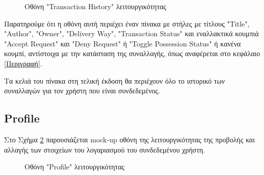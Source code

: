 \documentclass[12pt,a4paper]{article}
\begin{document}
\begin{figure}[H]
	\caption{Οθόνη "Transaction History" λειτουργικότητας}
	\label{Οθόνη "Transaction History" λειτουργικότητας}
\end{figure}

Παρατηρούμε ότι η οθόνη αυτή περιέχει έναν πίνακα με στήλες με τίτλους "Title", "Author", "Owner", "Delivery Way", "Transaction Status" και εναλλακτικά κουμπιά "Accept Request" και "Deny Request" ή "Toggle Possession Status" ή κανένα κουμπί, αντίστοιχα με την κατάσταση της συναλλαγής, όπως αναφέρεται στο κεφάλαιο \ref{Περιγραφή}.

Τα κελιά του πίνακα στη τελική έκδοση θα περιέχουν όλο το ιστορικό των συναλλαγών για τον χρήστη που είναι συνδεδεμένος.

\subsection{Profile}

Στο Σχήμα \ref{Οθόνη "Profile" λειτουργικότητας} παρουσιάζεται mock-up οθόνη της λειτουργικότητας της προβολής και αλλαγής των στοιχείων του λογαριασμού του συνδεδεμένου χρήστη.

\begin{figure}[H]
	\caption{Οθόνη "Profile" λειτουργικότητας}
	\label{Οθόνη "Profile" λειτουργικότητας}
\end{figure}
\end{document}
